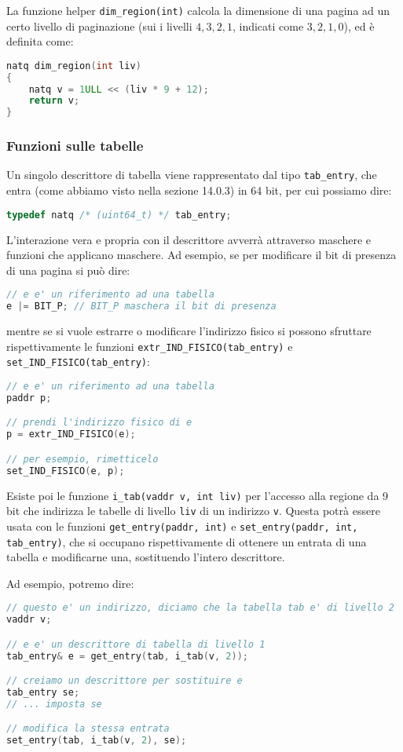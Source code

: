 \documentclass[a4paper,11pt]{article}
\begin{document}
La funzione helper \lstinline|dim_region(int)| calcola la dimensione di una pagina ad un certo livello di paginazione (sui i livelli $4, 3, 2, 1$, indicati come $3, 2, 1, 0$), ed è definita come:
\begin{lstlisting}[language=C++, style=codestyle]	
natq dim_region(int liv)
{
	natq v = 1ULL << (liv * 9 + 12);
	return v;
}
\end{lstlisting}

\subsubsection{Funzioni sulle tabelle}
Un singolo descrittore di tabella viene rappresentato dal tipo \lstinline|tab_entry|, che entra (come abbiamo visto nella sezione 14.0.3) in 64 bit, per cui possiamo dire:
\begin{lstlisting}[language=C++, style=codestyle]	
typedef natq /* (uint64_t) */ tab_entry;
\end{lstlisting}

L'interazione vera e propria con il descrittore avverrà attraverso maschere e funzioni che applicano maschere.
Ad esempio, se per modificare il bit di presenza di una pagina si può dire:
\begin{lstlisting}[language=C++, style=codestyle]	
// e e' un riferimento ad una tabella
e |= BIT_P; // BIT_P maschera il bit di presenza
\end{lstlisting}
mentre se si vuole estrarre o modificare l'indirizzo fisico si possono sfruttare rispettivamente le funzioni \lstinline|extr_IND_FISICO(tab_entry)| e \lstinline|set_IND_FISICO(tab_entry)|:
\begin{lstlisting}[language=C++, style=codestyle]	
// e e' un riferimento ad una tabella
paddr p;

// prendi l'indirizzo fisico di e
p = extr_IND_FISICO(e);

// per esempio, rimetticelo
set_IND_FISICO(e, p);
\end{lstlisting}

Esiste poi le funzione \lstinline|i_tab(vaddr v, int liv)| per l'accesso alla regione da 9 bit che indirizza le tabelle di livello \lstinline|liv| di un indirizzo \lstinline|v|.
Questa potrà essere usata con le funzioni \lstinline|get_entry(paddr, int)| e \lstinline|set_entry(paddr, int, tab_entry)|, che si occupano rispettivamente di ottenere un entrata di una tabella e modificarne una, sostituendo l'intero descrittore.

Ad esempio, potremo dire:
\begin{lstlisting}[language=C++, style=codestyle]	
// questo e' un indirizzo, diciamo che la tabella tab e' di livello 2
vaddr v;

// e e' un descrittore di tabella di livello 1 
tab_entry& e = get_entry(tab, i_tab(v, 2));

// creiamo un descrittore per sostituire e
tab_entry se;
// ... imposta se

// modifica la stessa entrata
set_entry(tab, i_tab(v, 2), se);
\end{lstlisting}
\end{document}
